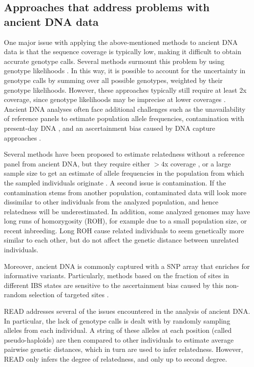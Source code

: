 \documentclass[12pt, letterpaper]{article}
\begin{document}
\subsection{Approaches that address problems with ancient DNA data}
One major issue with applying the above-mentioned methods to ancient DNA data is that the sequence coverage is typically low, making it difficult to obtain accurate genotype calls.
Several methods surmount this problem by using genotype likelihoods \cite{lipatov_maximum_2015,korneliussen_ngsrelate_2015}. In this way, it is possible to account for the uncertainty in genotype calls by summing over all possible genotypes, weighted by their genotype likelihoods. However, these approaches typically still require at least 2x coverage, since genotype likelihoods may be imprecise at lower coverages \cite{korneliussen_angsd_2014} . Ancient DNA analyses often face additional challenges such as the unavailability of  reference panels to estimate population allele frequencies, contamination with present-day DNA \cite{peyregne_present-day_2020-1}, and an ascertainment bias caused by  DNA capture approaches \cite{prufer_computational_2010, vai_kinship_2020}.

Several methods have been proposed to estimate relatedness without a reference panel from ancient DNA, but they  require either $>4$x coverage \cite{waples_allele_2019}, or a large sample size to get an estimate of allele frequencies in the population from which the sampled individuals originate \cite{theunert_joint_2017}. A second issue is contamination. If the contamination stems from another population, contaminated data will look more dissimilar to other individuals from the analyzed population, and hence relatedness will be underestimated. In addition, some analyzed  genomes may have long runs of homozygosity (ROH), for example due to a small population size, or recent inbreeding. Long ROH cause related individuals to seem genetically more similar to each other, but do not affect the genetic distance between unrelated individuals.

Moreover, ancient DNA is commonly captured with a SNP array that enriches for informative variants. Particularly, methods based on the fraction of sites in different IBS states are sensitive to the ascertainment bias caused by this non-random selection of targeted sites \cite{waples_allele_2019}. 

READ \cite{kuhn_estimating_2018} addresses several of the issues encountered in the analysis of ancient DNA. In particular, the lack of genotype calls is dealt with by randomly sampling alleles from each individual. A string of these alleles at each position (called pseudo-haploids) are then compared to other individuals to estimate  average pairwise genetic distances, which in turn are used to infer relatedness. However, READ only infers the degree of relatedness, and only up to second degree.
\end{document}
